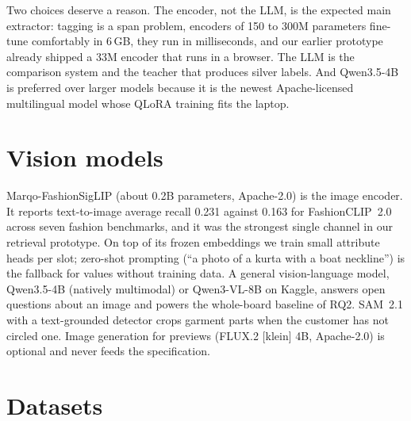 Two choices deserve a reason. The encoder, not the LLM, is the expected main extractor: tagging is a span problem, encoders of 150 to 300M parameters fine-tune comfortably in 6\,GB, they run in milliseconds, and our earlier prototype already shipped a 33M encoder that runs in a browser. The LLM is the comparison system and the teacher that produces silver labels. And Qwen3.5-4B is preferred over larger models because it is the newest Apache-licensed multilingual model whose QLoRA training fits the laptop.

\section{Vision models}

Marqo-FashionSigLIP \cite{marqo2024} (about 0.2B parameters, Apache-2.0) is the image encoder. It reports text-to-image average recall 0.231 against 0.163 for FashionCLIP~2.0 across seven fashion benchmarks, and it was the strongest single channel in our retrieval prototype. On top of its frozen embeddings we train small attribute heads per slot; zero-shot prompting (``a photo of a kurta with a boat neckline'') is the fallback for values without training data. A general vision-language model, Qwen3.5-4B (natively multimodal) or Qwen3-VL-8B on Kaggle, answers open questions about an image and powers the whole-board baseline of RQ2. SAM~2.1 with a text-grounded detector crops garment parts when the customer has not circled one. Image generation for previews (FLUX.2 [klein] 4B, Apache-2.0) is optional and never feeds the specification.

\section{Datasets}

